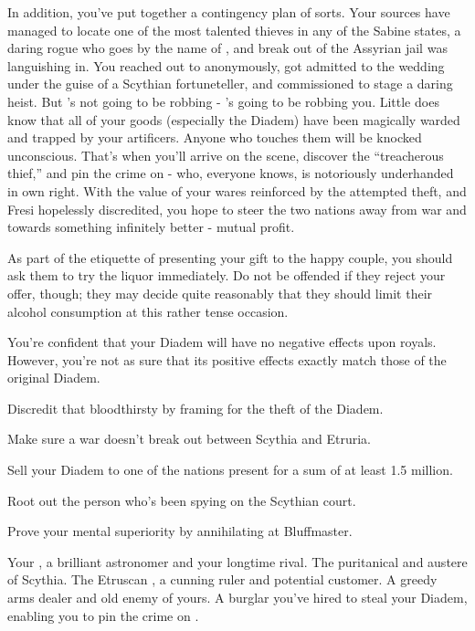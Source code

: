 \documentclass[char]{Kos}
\begin{document}
In addition, you've put together a contingency plan of sorts. Your sources have managed to locate one of the most talented thieves in any of the Sabine states, a daring rogue who goes by the name of \cBurglar{}, and break \cBurglar{\them} out of the Assyrian jail \cBurglar{\they} was languishing in. You reached out to \cBurglar{\them} anonymously, got \cBurglar{\them} admitted to the wedding under the guise of a Scythian fortuneteller, and commissioned \cBurglar{\them} to stage a daring heist. But \cBurglar{\they}'s not going to be robbing \cArmsDealer{} - \cBurglar{\they}'s going to be robbing you. Little does \cBurglar{\they} know that all of your goods (especially the Diadem) have been magically warded and trapped by your artificers. Anyone who touches them will be knocked unconscious. That's when you'll arrive on the scene, discover the ``treacherous thief,'' and pin the crime on \cArmsDealer{} - who, everyone knows, is notoriously underhanded in \cArmsDealer{\their} own right. With the value of your wares reinforced by the attempted theft, and Fresi hopelessly discredited, you hope to steer the two nations away from war and towards something infinitely better - mutual profit.

\begin{itemz}[Notes]
  \item As part of the etiquette of presenting your gift to the happy couple, you should ask them to try the liquor immediately. Do not be offended if they reject your offer, though; they may decide quite reasonably that they should limit their alcohol consumption at this rather tense occasion.
  \item You're confident that your Diadem will have no negative effects upon royals. However, you're not as sure that its positive effects exactly match those of the original Diadem.
\end{itemz}


\begin{itemz}[Goals]
\item Discredit that bloodthirsty \cArmsDealer{\InsultThree} \cArmsDealer{} by framing \cArmsDealer{\them} for the theft of the Diadem.
\item Make sure a war doesn't break out between Scythia and Etruria.
\item Sell your Diadem to one of the nations present for a sum of at least 1.5 million.
\item Root out the person who's been spying on the Scythian court.
\item Prove your mental superiority by annihilating \cArmsDealer{} at Bluffmaster.
\end{itemz}

\begin{contacts}
\contact{\cAnarchist{}} Your \cAnarchist{\sibling}, a brilliant astronomer and your longtime rival.
\contact{\cScythiaQueen{}} The puritanical and austere \cScythiaQueen{\monarch} of Scythia.
\contact{\cEtruriaKing{}} The Etruscan \cEtruriaKing{\monarch}, a cunning ruler and potential customer.
\contact{\cArmsDealer{}} A greedy arms dealer and old enemy of yours.
\contact{\cBurglar{}} A burglar you've hired to steal your Diadem, enabling you to pin the crime on \cArmsDealer{}.
\end{contacts}
\end{document}
